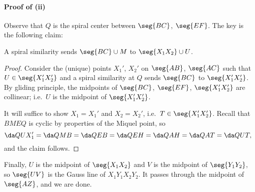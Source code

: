 \paragraph{Proof of (ii)} Observe that $Q$ is the spiral center between $\seg{BC}$, $\seg{EF}$. The key is the following claim:
\begin{claim*}
    A spiral similarity sends $\seg{BC}\cup M$ to $\seg{X_1X_2}\cup U$.
\end{claim*}
\begin{proof}
    Consider the (unique) points $X_1'$, $X_2'$ on $\seg{AB}$, $\seg{AC}$ such that $U\in\seg{X_1'X_2'}$ and a spiral similarity at $Q$ sends $\seg{BC}$ to $\seg{X_1'X_2'}$. By gliding principle, the midpoints of $\seg{BC}$, $\seg{EF}$, $\seg{X_1'X_2'}$ are collinear; i.e.\ $U$ is the midpoint of $\seg{X_1'X_2'}$.

    It will suffice to show $X_1=X_1'$ and $X_2=X_2'$, i.e.\ $T\in\seg{X_1'X_2'}$. Recall that $BMEQ$ is cyclic by properties of the Miquel point, so \[\da QUX_1'=\da QMB=\da QEB=\da QEH=\da QAH=\da QAT=\da QUT,\]
    and the claim follows.
\end{proof}

Finally, $U$ is the midpoint of $\seg{X_1X_2}$ and $V$ is the midpoint of $\seg{Y_1Y_2}$, so $\seg{UV}$ is the Gauss line of $X_1Y_1X_2Y_2$. It passes through the midpoint of $\seg{AZ}$, and we are done.

